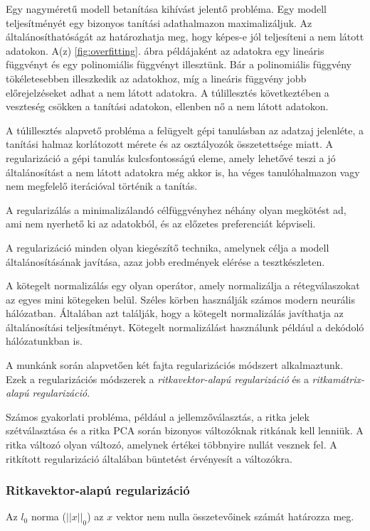 \documentclass[12pt,a4]{article}
\begin{document}
        Egy nagyméretű modell betanítása kihívást jelentő probléma. Egy modell teljesítményét egy bizonyos tanítási adathalmazon maximalizáljuk. Az általánosíthatóságát az határozhatja meg, hogy képes-e jól teljesíteni a nem látott adatokon. A(z) \ref{fig:overfitting}. ábra példájaként az adatokra egy lineáris függvényt és egy polinomiális függvényt illesztünk. Bár a polinomiális függvény tökéletesebben illeszkedik az adatokhoz, míg a lineáris függvény jobb előrejelzéseket adhat a nem látott adatokra. A túlillesztés következtében a veszteség csökken a tanítási adatokon, ellenben nő a nem látott adatokon.

        A túlillesztés alapvető probléma a felügyelt gépi tanulásban az adatzaj jelenléte, a tanítási halmaz korlátozott mérete és az osztályozók összetettsége miatt. A regularizáció a gépi tanulás kulcsfontosságú eleme, amely lehetővé teszi a jó általánosítást a nem látott adatokra még akkor is, ha véges tanulóhalmazon vagy nem megfelelő iterációval történik a tanítás.

        A regularizálás a minimalizálandó célfüggvényhez néhány olyan megkötést ad, ami nem nyerhető ki az adatokból, és az előzetes preferenciát képviseli.

        A regularizáció minden olyan kiegészítő technika, amelynek célja a modell általánosításának javítása, azaz jobb eredmények elérése a tesztkészleten.

        A kötegelt normalizálás egy olyan operátor, amely normalizálja a rétegválaszokat az egyes mini kötegeken belül. Széles körben használják számos modern neurális hálózatban. Általában azt találják, hogy a kötegelt normalizálás javíthatja az általánosítási teljesítményt. Kötegelt normalizálást használunk például a dekódoló hálózatunkban is.

        A munkánk során alapvetően két fajta regularizációs módszert alkalmaztunk. Ezek a regularizációs  módszerek a \textit{ritkavektor-alapú regularizáció} és a \textit{ritkamátrix-alapú regularizáció}.

        Számos gyakorlati probléma, például a jellemzőválasztás, a ritka jelek szétválasztása és a ritka PCA során bizonyos változóknak ritkának kell lenniük. A ritka változó olyan változó, amelynek értékei többnyire nullát vesznek fel. A ritkított regularizáció általában büntetést érvényesít a változókra.
        
        \subsubsection{Ritkavektor-alapú regularizáció}
        Az $l_{0}$ norma ($|| x ||_{0}$) az $x$ vektor nem nulla összetevőinek számát határozza meg.
        
\end{document}
